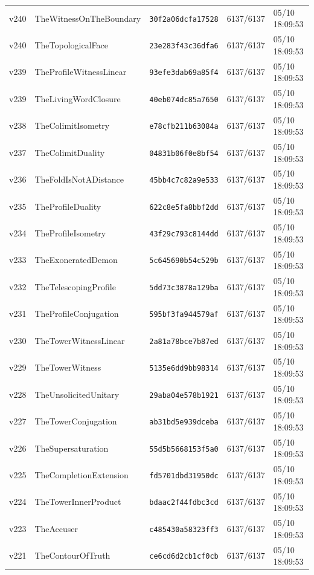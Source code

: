 \documentclass[11pt]{article}
\theoremstyle{definition}\newtheorem{deriv}{Derivation}
\begin{document}
{\begin{longtable}{@{}lllll@{}}
v240 & TheWitnessOnTheBoundary & \texttt{30f2a06dcfa17528} & 6137/6137 & 05/10 18:09:53 \\
v240 & TheTopologicalFace & \texttt{23e283f43c36dfa6} & 6137/6137 & 05/10 18:09:53 \\
v239 & TheProfileWitnessLinear & \texttt{93efe3dab69a85f4} & 6137/6137 & 05/10 18:09:53 \\
v239 & TheLivingWordClosure & \texttt{40eb074dc85a7650} & 6137/6137 & 05/10 18:09:53 \\
v238 & TheColimitIsometry & \texttt{e78cfb211b63084a} & 6137/6137 & 05/10 18:09:53 \\
v237 & TheColimitDuality & \texttt{04831b06f0e8bf54} & 6137/6137 & 05/10 18:09:53 \\
v236 & TheFoldIsNotADistance & \texttt{45bb4c7c82a9e533} & 6137/6137 & 05/10 18:09:53 \\
v235 & TheProfileDuality & \texttt{622c8e5fa8bbf2dd} & 6137/6137 & 05/10 18:09:53 \\
v234 & TheProfileIsometry & \texttt{43f29c793c8144dd} & 6137/6137 & 05/10 18:09:53 \\
v233 & TheExoneratedDemon & \texttt{5c645690b54c529b} & 6137/6137 & 05/10 18:09:53 \\
v232 & TheTelescopingProfile & \texttt{5dd73c3878a129ba} & 6137/6137 & 05/10 18:09:53 \\
v231 & TheProfileConjugation & \texttt{595bf3fa944579af} & 6137/6137 & 05/10 18:09:53 \\
v230 & TheTowerWitnessLinear & \texttt{2a81a78bce7b87ed} & 6137/6137 & 05/10 18:09:53 \\
v229 & TheTowerWitness & \texttt{5135e6dd9bb98314} & 6137/6137 & 05/10 18:09:53 \\
v228 & TheUnsolicitedUnitary & \texttt{29aba04e578b1921} & 6137/6137 & 05/10 18:09:53 \\
v227 & TheTowerConjugation & \texttt{ab31bd5e939dceba} & 6137/6137 & 05/10 18:09:53 \\
v226 & TheSupersaturation & \texttt{55d5b5668153f5a0} & 6137/6137 & 05/10 18:09:53 \\
v225 & TheCompletionExtension & \texttt{fd5701dbd31950dc} & 6137/6137 & 05/10 18:09:53 \\
v224 & TheTowerInnerProduct & \texttt{bdaac2f44fdbc3cd} & 6137/6137 & 05/10 18:09:53 \\
v223 & TheAccuser & \texttt{c485430a58323ff3} & 6137/6137 & 05/10 18:09:53 \\
v221 & TheContourOfTruth & \texttt{ce6cd6d2cb1cf0cb} & 6137/6137 & 05/10 18:09:53 \\

\end{longtable}}
\end{document}
